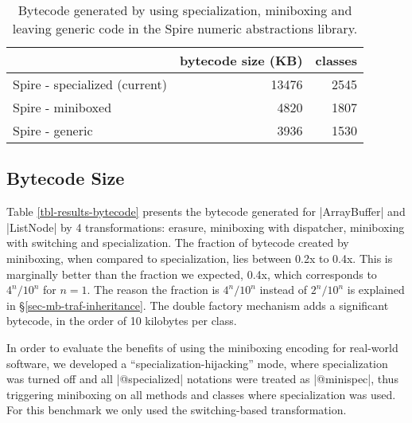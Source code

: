 \begin{table}[b!]
\centering
\small
\begin{tabular}{l|r|r}
                               &  bytecode size (KB) & classes \\\hline 
Spire - specialized (current)  &               13476 &    2545 \\
\rowcolor{Gray}
Spire - miniboxed              &                4820 &    1807 \\
Spire - generic                &                3936 &    1530 \\
\end{tabular}
\caption{Bytecode generated by using specialization, miniboxing and leaving generic code in the Spire numeric abstractions library.}
\label{tbl-results-bytecode-spire}
\end{table}

\subsection{Bytecode Size}
\label{subsec-eval-size}

Table \ref{tbl-results-bytecode} presents the bytecode generated for |ArrayBuffer| and |ListNode| by 4 transformations: erasure, miniboxing with dispatcher, miniboxing with switching and specialization. The fraction of bytecode created by miniboxing, when compared to specialization, lies between 0.2x to 0.4x. This is marginally better than the fraction we expected, 0.4x, which corresponds to $4^n / 10^n$ for $n=1$. The reason the fraction is $4^n / 10^n$ instead of $2^n / 10^n$ is explained in \S \ref{sec-mb-traf-inheritance}. The double factory mechanism adds a significant bytecode, in the order of 10 kilobytes per class.

In order to evaluate the benefits of using the miniboxing encoding for real-world software, we developed a ``specialization-hijacking'' mode, where specialization was turned off and all |@specialized| notations were treated as |@minispec|, thus triggering miniboxing on all methods and classes where specialization was used. For this benchmark we only used the switching-based transformation.
 
